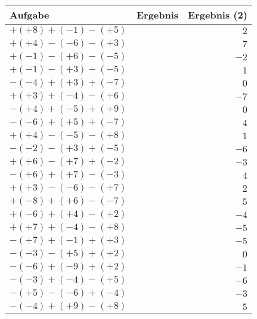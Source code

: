 \documentclass[a4paper,12pt]{scrartcl}
\begin{document}
\begin{center}
\begin{tabular}{|l|l|r|}
\hline
Aufgabe & Ergebnis\hspace{100} & Ergebnis (2)\\ \hline\hline
$+(+8)+(-1)-(+5)$ & & $2$\\ \hline                               
$+(+4)-(-6)-(+3)$ & & $7$\\ \hline                               
$+(-1)-(+6)-(-5)$ & & $-2$\\ \hline                              
$+(-1)-(+3)-(-5)$ & & $1$\\ \hline                               
$-(-4)+(+3)+(-7)$ & & $0$\\ \hline                               
$+(+3)+(-4)-(+6)$ & & $-7$\\ \hline                              
$-(+4)+(-5)+(+9)$ & & $0$\\ \hline                               
$-(-6)+(+5)+(-7)$ & & $4$\\ \hline                               
$+(+4)-(-5)-(+8)$ & & $1$\\ \hline                               
$-(-2)-(+3)+(-5)$ & & $-6$\\ \hline                              
$+(+6)-(+7)+(-2)$ & & $-3$\\ \hline                              
$-(+6)+(+7)-(-3)$ & & $4$\\ \hline                               
$+(+3)-(-6)-(+7)$ & & $2$\\ \hline                               
$+(-8)+(+6)-(-7)$ & & $5$\\ \hline                               
$+(-6)+(+4)-(+2)$ & & $-4$\\ \hline                              
$+(+7)+(-4)-(+8)$ & & $-5$\\ \hline                              
$-(+7)+(-1)+(+3)$ & & $-5$\\ \hline                              
$-(-3)-(+5)+(+2)$ & & $0$\\ \hline                               
$-(-6)+(-9)+(+2)$ & & $-1$\\ \hline                              
$-(-3)+(-4)-(+5)$ & & $-6$\\ \hline                              
$-(+5)-(-6)+(-4)$ & & $-3$\\ \hline                              
$-(-4)+(+9)-(+8)$ & & $5$\\ \hline                               

\end{tabular}
\end{center}
\end{document}

